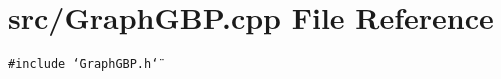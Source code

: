 \section{src/GraphGBP.cpp File Reference}
\label{GraphGBP_8cpp}
{\tt \#include \char`\"{}GraphGBP.h\char`\"{}}\par
